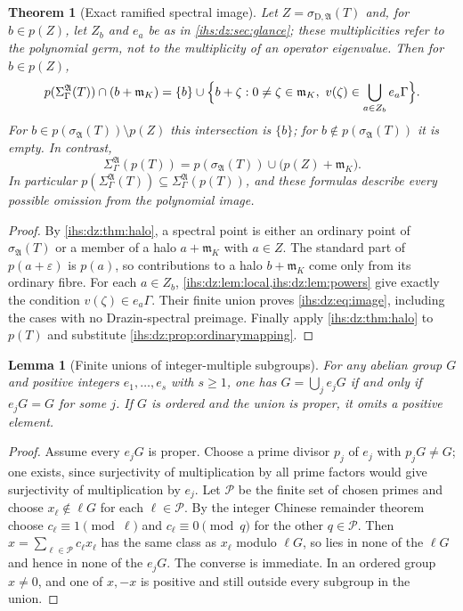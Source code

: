 \documentclass[11pt,a4paper]{article}
\numberwithin{equation}{section}
\newtheorem{theorem}{Theorem}[section]
\newtheorem{lemma}[lemma]{Lemma}
\theoremstyle{definition}
\theoremstyle{remark}
\newcommand{\mK}{\mathfrak m_K}
\newcommand{\eps}{\varepsilon}
\newcommand{\Alg}{\mathfrak A}
\newcommand{\SigA}{\Sigma^{\Alg}_\Gamma}
\newcommand{\sigD}{\sigma_{\mathrm D,\Alg}}
\begin{document}
\begin{theorem}[Exact ramified spectral image]\label{ihs:dz:thm:image}
Let $Z=\sigD(T)$ and, for $b\in p(Z)$, let $Z_b$ and $e_a$ be as in
\cref{ihs:dz:sec:glance}; these multiplicities refer to the polynomial germ,
not to the multiplicity of an operator eigenvalue. Then for $b\in p(Z)$,
\begin{equation}\label{ihs:dz:eq:image}
 p(\SigA(T))\cap(b+\mK)=\{b\}\cup
 \Bigl\{b+\zeta:0\ne\zeta\in\mK,\ v(\zeta)\in\bigcup_{a\in Z_b}e_a\Gamma\Bigr\}.
\end{equation}
For $b\in p(\sigma_\Alg(T))\setminus p(Z)$ this intersection is $\{b\}$; for
$b\notin p(\sigma_\Alg(T))$ it is empty. In contrast,
\begin{equation}\label{ihs:dz:eq:polyspectrum}
 \SigA(p(T))=p(\sigma_\Alg(T))\cup\bigl(p(Z)+\mK\bigr).
\end{equation}
In particular $p(\SigA(T))\subseteq\SigA(p(T))$, and these formulas describe
every possible omission from the polynomial image.
\end{theorem}
\begin{proof}
By \cref{ihs:dz:thm:halo}, a spectral point is either an ordinary point of
$\sigma_\Alg(T)$ or a member of a halo $a+\mK$ with $a\in Z$. The standard
part of $p(a+\eps)$ is $p(a)$, so contributions to a halo $b+\mK$ come only
from its ordinary fibre. For each $a\in Z_b$,
\cref{ihs:dz:lem:local,ihs:dz:lem:powers} give exactly the condition
$v(\zeta)\in e_a\Gamma$. Their finite union proves \eqref{ihs:dz:eq:image},
including the cases with no Drazin-spectral preimage. Finally apply
\cref{ihs:dz:thm:halo} to $p(T)$ and substitute
\cref{ihs:dz:prop:ordinarymapping}.
\end{proof}

\begin{lemma}[Finite unions of integer-multiple subgroups]\label{ihs:dz:lem:group}
For any abelian group $G$ and positive integers $e_1,\ldots,e_s$ with
$s\ge1$, one has $G=\bigcup_je_jG$ if and only if $e_jG=G$ for some $j$. If
$G$ is ordered and the union is proper, it omits a positive element.
\end{lemma}
\begin{proof}
Assume every $e_jG$ is proper. Choose a prime divisor $p_j$ of $e_j$ with
$p_jG\ne G$; one exists, since surjectivity of multiplication by all prime
factors would give surjectivity of multiplication by $e_j$. Let $\mathcal P$
be the finite set of chosen primes and choose $x_\ell\notin \ell G$ for each
$\ell\in\mathcal P$. By the integer Chinese remainder theorem choose
$c_\ell\equiv1\pmod \ell$ and $c_\ell\equiv0\pmod q$ for the other
$q\in\mathcal P$. Then $x=\sum_{\ell\in\mathcal P}c_\ell x_\ell$ has the same
class as $x_\ell$ modulo $\ell G$, so lies in none of the $\ell G$ and hence
in none of the $e_jG$. The converse is immediate. In an ordered group
$x\ne0$, and one of $x,-x$ is positive and still outside every subgroup in
the union.
\end{proof}
\end{document}
